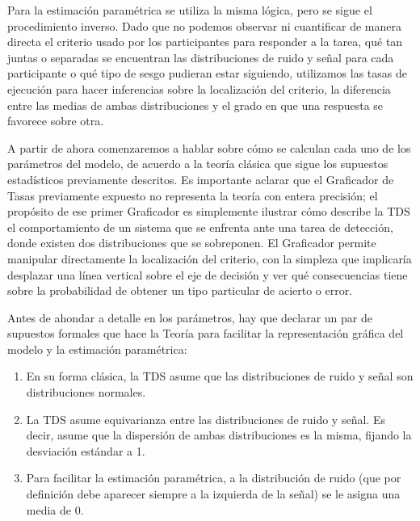 Para la estimación paramétrica se utiliza la misma lógica, pero se sigue el procedimiento inverso. Dado que no podemos observar ni cuantificar de manera directa el criterio usado por los participantes para responder a la tarea, qué tan juntas o separadas se encuentran las distribuciones de ruido y señal para cada participante o qué tipo de sesgo pudieran estar siguiendo, utilizamos las tasas de ejecución para hacer inferencias sobre la localización del criterio, la diferencia entre las medias de ambas distribuciones y el grado en que una respuesta se favorece sobre otra. 

A partir de ahora comenzaremos a hablar sobre cómo se calculan cada uno de los parámetros del modelo, de acuerdo a la teoría clásica que sigue los supuestos estadísticos previamente descritos.  Es importante aclarar que el Graficador de Tasas previamente expuesto no representa la teoría con entera precisión; el propósito de ese primer Graficador es simplemente ilustrar cómo describe la TDS el comportamiento de un sistema que se enfrenta ante una tarea de detección, donde existen dos distribuciones que se sobreponen. El Graficador permite manipular directamente la localización del criterio, con la simpleza que implicaría desplazar una línea vertical sobre el eje de decisión y ver qué consecuencias tiene sobre la probabilidad de obtener un tipo particular de acierto o error.


Antes de ahondar a detalle en los parámetros, hay que declarar un par de supuestos formales que hace la Teoría para facilitar la representación gráfica del modelo y la estimación paramétrica:

\begin{enumerate}
\item En su forma clásica, la TDS asume que las distribuciones de ruido y señal son distribuciones normales.
\item La TDS asume equivarianza entre las distribuciones de ruido y señal. Es decir, asume que la dispersión de ambas distribuciones es la misma, fijando la desviación estándar a 1.
\item Para facilitar la estimación paramétrica, a la distribución de ruido (que por definición debe aparecer siempre a la izquierda de la señal) se le asigna una media de 0.
\end{enumerate}


